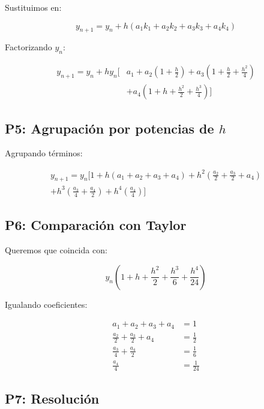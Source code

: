 \documentclass[12pt,a4paper]{article}
\begin{document}
Sustituimos en:

\begin{equation}
y_{n+1} = y_n + h(a_1 k_1 + a_2 k_2 + a_3 k_3 + a_4 k_4)
\end{equation}

Factorizando $y_n$:

\begin{align}
y_{n+1} = y_n + h y_n \Big[ 
& a_1 
+ a_2 \left(1 + \frac{h}{2}\right)
+ a_3 \left(1 + \frac{h}{2} + \frac{h^2}{4}\right) \\
& + a_4 \left(1 + h + \frac{h^2}{2} + \frac{h^3}{4}\right)
\Big]
\end{align}

\subsection*{P5: Agrupación por potencias de $h$}

Agrupando términos:

\begin{align}
y_{n+1} = y_n \Big[
1 
+ h(a_1 + a_2 + a_3 + a_4)
+ h^2\left(\frac{a_2}{2} + \frac{a_3}{2} + a_4\right) \\
+ h^3\left(\frac{a_3}{4} + \frac{a_4}{2}\right)
+ h^4\left(\frac{a_4}{4}\right)
\Big]
\end{align}

\subsection*{P6: Comparación con Taylor}

Queremos que coincida con:

\begin{equation}
y_n \left(1 + h + \frac{h^2}{2} + \frac{h^3}{6} + \frac{h^4}{24}\right)
\end{equation}

Igualando coeficientes:

\begin{align}
a_1 + a_2 + a_3 + a_4 &= 1 \\
\frac{a_2}{2} + \frac{a_3}{2} + a_4 &= \frac{1}{2} \\
\frac{a_3}{4} + \frac{a_4}{2} &= \frac{1}{6} \\
\frac{a_4}{4} &= \frac{1}{24}
\end{align}

\subsection*{P7: Resolución}
\end{document}

